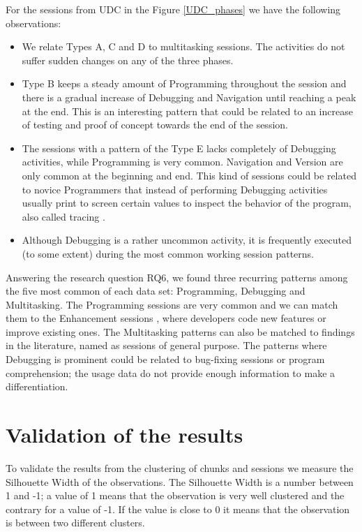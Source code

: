 For the sessions from UDC in the Figure \ref{UDC_phases} we have the following observations:
\begin{itemize}
	\item We relate Types A, C and D to multitasking sessions. The activities do not suffer sudden changes on any of the three phases.
	
	\item Type B keeps a steady amount of Programming throughout the session and there is a gradual increase of Debugging and Navigation until reaching a peak at the end. This is an interesting pattern that could be related to an increase of testing and proof of concept towards the end of the session.
	
	\item The sessions with a pattern of the Type E lacks completely of Debugging activities, while Programming is very common. Navigation and Version are only common at the beginning and end. This kind of sessions could be related to novice Programmers that instead of performing Debugging activities usually print to screen certain values to inspect the behavior of the program, also called tracing \cite{MKM08, AEH05}.
	
	\item Although Debugging is a rather uncommon activity, it is frequently executed (to some extent) during the most common working session patterns.
\end{itemize}

\begin{changedforreviewerlong}


Answering the research question RQ6, we found three recurring patterns among the five most common of each data set: Programming, Debugging and Multitasking. The Programming sessions are very common and we can match them to the Enhancement sessions \cite{B14}, where developers code new features or improve existing ones. The Multitasking patterns can also be matched to findings in the literature, named as sessions of general purpose. The patterns where Debugging is prominent could be related to bug-fixing sessions or program comprehension; the usage data do not provide enough information to make a differentiation. 
\end{changedforreviewerlong}

\section{Validation of the results}
To validate the results from the clustering of chunks and sessions we measure the Silhouette Width of the observations. The Silhouette Width is a number between 1 and -1; a value of 1 means that the observation is very well clustered and the contrary for a value of -1. If the value is close to 0 it means that the observation is between two different clusters.

